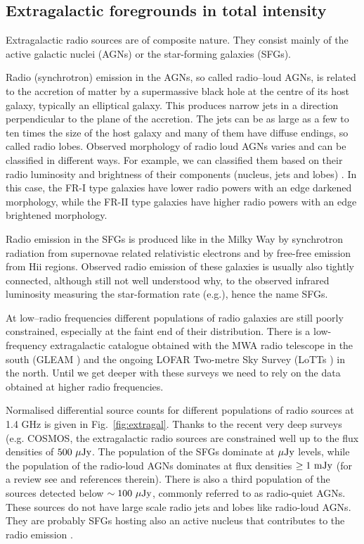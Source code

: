 \subsection{Extragalactic foregrounds in total intensity}
Extragalactic radio sources are of composite nature.  They consist mainly of the active galactic nuclei (AGNs) or the star-forming galaxies (SFGs). 

Radio (synchrotron) emission in the AGNs, so called radio--loud AGNs, is related to the accretion of matter by a supermassive black hole at the centre of its host galaxy, typically an elliptical galaxy.  This produces narrow  jets in a direction perpendicular to the plane of the accretion. The jets can be as large as a few to ten times the size 
of the host galaxy and many of them have diffuse endings, so called radio lobes. Observed morphology of radio loud AGNs varies and can be classified in different ways. For example, we can classified them based on their radio luminosity and brightness of their components (nucleus, jets and lobes) \cite{fanaroff74}. In this case, the FR-I type galaxies  have lower radio powers with an edge darkened morphology, while the FR-II type galaxies have higher radio powers with an edge brightened morphology.

Radio emission in the SFGs is produced like in the Milky Way by synchrotron radiation from supernovae related relativistic electrons and by free-free emission from H{\sc ii} regions. Observed radio emission of these galaxies is usually also tightly connected, although still not well understood why, to the observed infrared luminosity measuring the star-formation rate (e.g.\cite{condon92, helou85, jarvis10}), hence the name SFGs. 

At low--radio frequencies different populations of radio galaxies are still poorly constrained, especially at the faint end of their distribution. There is a low-frequency extragalactic catalogue obtained with the MWA radio telescope in the south (GLEAM \cite{hurleywalker17}) and the ongoing LOFAR Two-metre Sky Survey (LoTTs \cite{shimwell17, shimwell19}) in the north. Until we get deeper with these surveys we need to rely on the data obtained at higher radio frequencies.

Normalised differential source counts for different populations of radio sources at 1.4 GHz is given in Fig.~\ref{fig:extragal}. Thanks to the recent very deep surveys (e.g. COSMOS, \cite{bondi08, novak18, smolcic17b, smolcic17a, smolcic17c} the extragalactic radio sources are constrained well up to the flux densities of $500~{\rm \mu Jy}$. The population of the SFGs dominate at $\mu{\rm Jy}$ levels, while the population of the radio-loud AGNs dominates at flux densities $\geq1~{{\rm mJy}}$ (for a review see \cite{prandoniIAUS333} and references therein). There is also a third population of the sources detected below $\sim100~{\rm \mu Jy}$, commonly referred to as radio-quiet AGNs. These sources do not have large scale radio jets and lobes like radio-loud AGNs. They are probably SFGs hosting also an active nucleus that contributes to the radio emission \cite{ceraj18, delvecchio17}. 

